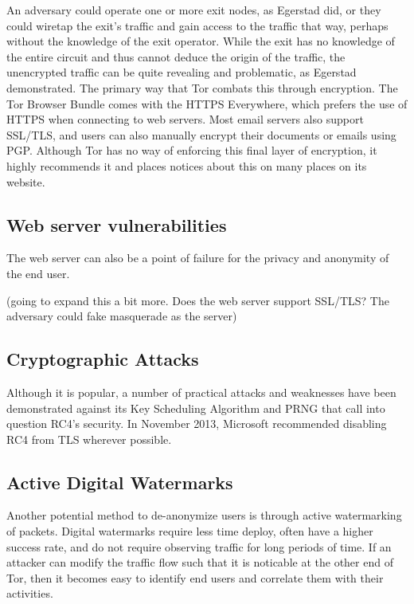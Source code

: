 \documentclass[journal]{IEEEtran}
\begin{document}
An adversary could operate one or more exit nodes, as Egerstad did, or they could wiretap the exit's traffic and gain access to the traffic that way, perhaps without the knowledge of the exit operator. While the exit has no knowledge of the entire circuit and thus cannot deduce the origin of the traffic, the unencrypted traffic can be quite revealing and problematic, as Egerstad demonstrated. The primary way that Tor combats this through encryption. The Tor Browser Bundle comes with the HTTPS Everywhere, which prefers the use of HTTPS when connecting to web servers. Most email servers also support SSL/TLS, and users can also manually encrypt their documents or emails using PGP. Although Tor has no way of enforcing this final layer of encryption, it highly recommends it and places notices about this on many places on its website.

\subsection{Web server vulnerabilities}

The web server can also be a point of failure for the privacy and anonymity of the end user.

(going to expand this a bit more. Does the web server support SSL/TLS? The adversary could fake masquerade as the server)

\subsection{Cryptographic Attacks}

Although it is popular, a number of practical attacks and weaknesses have been demonstrated against its Key Scheduling Algorithm and PRNG that call into question RC4's security. In November 2013, Microsoft recommended disabling RC4 from TLS wherever possible.

\subsection{Active Digital Watermarks}

Another potential method to de-anonymize users is through active watermarking of packets. Digital watermarks require less time deploy, often have a higher success rate, and do not require observing traffic for long periods of time. If an attacker can modify the traffic flow such that it is noticable at the other end of Tor, then it becomes easy to identify end users and correlate them with their activities.
\end{document}
